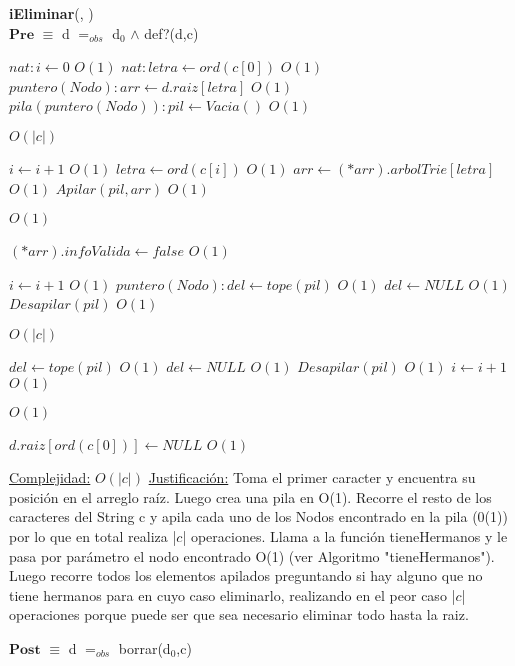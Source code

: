 \begin{algorithm}[H]{\textbf{iEliminar}(, )}
	{\\ $\textbf{Pre}$ $\equiv$ d $=_{obs}$ d$_0$ $\land$ def?(d,c)}
	\begin{algorithmic}

		\State $nat: i \gets 0$ \Comment $O(1)$
		\State $nat: letra \gets ord(c[0])$ \Comment $O(1)$
		\State $puntero(Nodo): arr \gets d.raiz[letra]$ \Comment $O(1)$
		\State $pila(puntero(Nodo)): pil \gets Vacia()$ \Comment $O(1)$

		 \Comment $O(|c|)$

			\State $i \gets i + 1$ \Comment $O(1)$
			\State $letra \gets ord(c[i])$ \Comment $O(1)$
			\State $arr \gets (*arr).arbolTrie[letra]$ \Comment $O(1)$
			\State $Apilar(pil,arr)$ \Comment $O(1)$

		\EndWhile

		 \Comment $O(1)$

			\State $(*arr).infoValida \gets false$ \Comment $O(1)$

		\Else

			\State $i \gets i + 1$ \Comment $O(1)$
			\State $puntero(Nodo): del \gets tope(pil)$ \Comment $O(1)$
			\State $del \gets NULL$ \Comment $O(1)$
			\State $Desapilar(pil)$ \Comment $O(1)$

			 \Comment $O(|c|)$

				\State $del \gets tope(pil)$ \Comment $O(1)$
				\State $del \gets NULL$ \Comment $O(1)$
				\State $Desapilar(pil)$ \Comment $O(1)$
				\State $i \gets i + 1$ \Comment $O(1)$

			\EndWhile

			 \Comment $O(1)$

				\State $d.raiz[ord(c[0])] \gets NULL$ \Comment $O(1)$

			\EndIf

		\EndIf

		\medskip
		\Statex \underline{Complejidad:} $O(|c|)$
		\Statex \underline{Justificación:} Toma el primer caracter y encuentra su posición en el arreglo raíz. Luego crea una pila en O(1). Recorre el resto de los caracteres del String c y apila cada uno de los Nodos encontrado en la pila (0(1)) por lo que en total realiza |$c$| operaciones. Llama a la función tieneHermanos y le pasa por parámetro el nodo encontrado O(1) (ver Algoritmo "tieneHermanos"). Luego recorre todos los elementos apilados preguntando si hay alguno que no tiene hermanos para en cuyo caso eliminarlo, realizando en el peor caso |$c$| operaciones porque puede ser que sea necesario eliminar todo hasta la raiz.

    \end{algorithmic}
    {$\textbf{Post}$ $\equiv$ d $=_{obs}$ borrar(d$_0$,c)}
\end{algorithm}


